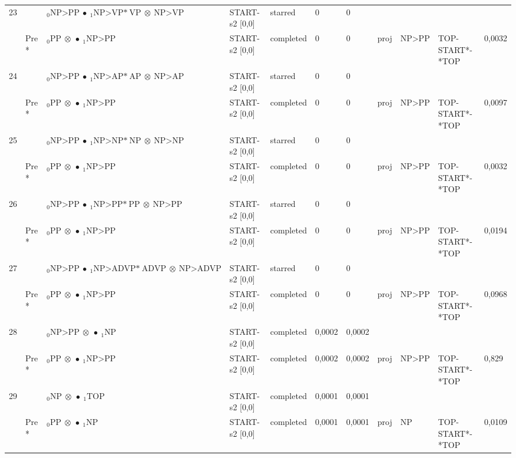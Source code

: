 \documentclass[10pt]{article}
\begin{document}
\begin{longtable}[htbp]{lllllllllll}
23 & & $ {}_0 \textrm{NP>PP} \  \bullet \ {}_{1} \textrm{NP>VP*} \ \textrm{VP} \  \otimes \ \textrm{NP>VP} $ & START-s2 [0,0] & starred & 0 & 0 & & & & \\ 
 & Pre *& $ {}_0 \textrm{PP} \  \otimes \  \bullet \ {}_{1} \textrm{NP>PP} $ & START-s2 [0,0] & completed & 0 & 0 & proj & NP>PP & TOP-START*-*TOP & 0,0032 \\ 
24 & & $ {}_0 \textrm{NP>PP} \  \bullet \ {}_{1} \textrm{NP>AP*} \ \textrm{AP} \  \otimes \ \textrm{NP>AP} $ & START-s2 [0,0] & starred & 0 & 0 & & & & \\ 
 & Pre *& $ {}_0 \textrm{PP} \  \otimes \  \bullet \ {}_{1} \textrm{NP>PP} $ & START-s2 [0,0] & completed & 0 & 0 & proj & NP>PP & TOP-START*-*TOP & 0,0097 \\ 
25 & & $ {}_0 \textrm{NP>PP} \  \bullet \ {}_{1} \textrm{NP>NP*} \ \textrm{NP} \  \otimes \ \textrm{NP>NP} $ & START-s2 [0,0] & starred & 0 & 0 & & & & \\ 
 & Pre *& $ {}_0 \textrm{PP} \  \otimes \  \bullet \ {}_{1} \textrm{NP>PP} $ & START-s2 [0,0] & completed & 0 & 0 & proj & NP>PP & TOP-START*-*TOP & 0,0032 \\ 
26 & & $ {}_0 \textrm{NP>PP} \  \bullet \ {}_{1} \textrm{NP>PP*} \ \textrm{PP} \  \otimes \ \textrm{NP>PP} $ & START-s2 [0,0] & starred & 0 & 0 & & & & \\ 
 & Pre *& $ {}_0 \textrm{PP} \  \otimes \  \bullet \ {}_{1} \textrm{NP>PP} $ & START-s2 [0,0] & completed & 0 & 0 & proj & NP>PP & TOP-START*-*TOP & 0,0194 \\ 
27 & & $ {}_0 \textrm{NP>PP} \  \bullet \ {}_{1} \textrm{NP>ADVP*} \ \textrm{ADVP} \  \otimes \ \textrm{NP>ADVP} $ & START-s2 [0,0] & starred & 0 & 0 & & & & \\ 
 & Pre *& $ {}_0 \textrm{PP} \  \otimes \  \bullet \ {}_{1} \textrm{NP>PP} $ & START-s2 [0,0] & completed & 0 & 0 & proj & NP>PP & TOP-START*-*TOP & 0,0968 \\ 
28 & & $ {}_0 \textrm{NP>PP} \  \otimes \  \bullet \ {}_{1} \textrm{NP} $ & START-s2 [0,0] & completed & 0,0002 & 0,0002 & & & & \\ 
 & Pre *& $ {}_0 \textrm{PP} \  \otimes \  \bullet \ {}_{1} \textrm{NP>PP} $ & START-s2 [0,0] & completed & 0,0002 & 0,0002 & proj & NP>PP & TOP-START*-*TOP & 0,829 \\ 
29 & & $ {}_0 \textrm{NP} \  \otimes \  \bullet \ {}_{1} \textrm{TOP} $ & START-s2 [0,0] & completed & 0,0001 & 0,0001 & & & & \\ 
 & Pre *& $ {}_0 \textrm{PP} \  \otimes \  \bullet \ {}_{1} \textrm{NP} $ & START-s2 [0,0] & completed & 0,0001 & 0,0001 & proj & NP & TOP-START*-*TOP & 0,0109 \\ 

\end{longtable}
\end{document}

